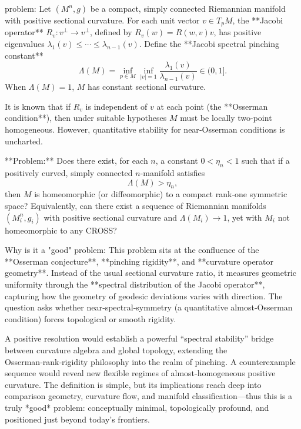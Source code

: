 problem:  
Let \( (M^n,g) \) be a compact, simply connected Riemannian manifold with positive sectional curvature.  
For each unit vector \(v\in T_pM\), the **Jacobi operator** \(R_v\colon v^\perp\to v^\perp\), defined by \(R_v(w)=R(w,v)v\), has positive eigenvalues \(\lambda_1(v)\le\cdots\le\lambda_{n-1}(v)\).  
Define the **Jacobi spectral pinching constant**
\[
\Lambda(M)=\inf_{p\in M}\inf_{|v|=1}\frac{\lambda_1(v)}{\lambda_{n-1}(v)}\in(0,1].
\]
When \(\Lambda(M)=1\), \(M\) has constant sectional curvature.

It is known that if \(R_v\) is independent of \(v\) at each point (the **Osserman condition**), then under suitable hypotheses \(M\) must be locally two-point homogeneous.  
However, quantitative stability for near‑Osserman conditions is uncharted.

**Problem:**  
Does there exist, for each \(n\), a constant \(0<\eta_n<1\) such that if a positively curved, simply connected \(n\)-manifold satisfies  
\[
\Lambda(M)>\eta_n,
\]
then \(M\) is homeomorphic (or diffeomorphic) to a compact rank‑one symmetric space?  
Equivalently, can there exist a sequence of Riemannian manifolds \((M_i^n,g_i)\) with positive sectional curvature and \(\Lambda(M_i)\to1\), yet with \(M_i\) not homeomorphic to any CROSS?  

Why is it a "good" problem:  
This problem sits at the confluence of the **Osserman conjecture**, **pinching rigidity**, and **curvature operator geometry**.  Instead of the usual sectional curvature ratio, it measures geometric uniformity through the **spectral distribution of the Jacobi operator**, capturing how the geometry of geodesic deviations varies with direction.  The question asks whether near‑spectral‑symmetry (a quantitative almost‑Osserman condition) forces topological or smooth rigidity.  

A positive resolution would establish a powerful “spectral stability” bridge between curvature algebra and global topology, extending the Osserman‑rank‑rigidity philosophy into the realm of pinching.  A counterexample sequence would reveal new flexible regimes of almost‑homogeneous positive curvature.  
The definition is simple, but its implications reach deep into comparison geometry, curvature flow, and manifold classification—thus this is a truly *good* problem: conceptually minimal, topologically profound, and positioned just beyond today’s frontiers.